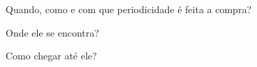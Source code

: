 \begin{commentA}
Quando, como e com que periodicidade é feita a compra?
\par \end{commentA}

\begin{commentA} \vspace{0.3cm} \noindent * \par \vspace{0.1cm} \end{commentA}

\begin{commentA}
Onde ele se encontra?
\par \end{commentA}

\begin{commentA} \vspace{0.3cm} \noindent * \par \vspace{0.1cm} \end{commentA}

\begin{commentA}
Como chegar até ele?
\par \end{commentA}






